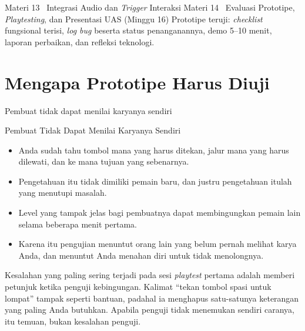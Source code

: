 \documentclass[aspectratio=169,10pt]{beamer}
\begin{document}
  {Materi 13 \textperiodcentered\ Integrasi Audio dan \emph{Trigger} Interaksi}
  {Materi 14 \textperiodcentered\ Evaluasi Prototipe, \emph{Playtesting}, dan
   Presentasi}
  {UAS (Minggu 16)}
  {Prototipe teruji: \emph{checklist} fungsional terisi, \emph{log bug} beserta
   status penanganannya, demo 5--10 menit, laporan perbaikan, dan refleksi
   teknologi.}

\section{Mengapa Prototipe Harus Diuji}
  {Pembuat tidak dapat menilai karyanya sendiri}

\begin{frame}{Pembuat Tidak Dapat Menilai Karyanya Sendiri}
\begin{itemize}
  \item Anda sudah tahu tombol mana yang harus ditekan, jalur mana yang harus
        dilewati, dan ke mana tujuan yang sebenarnya.
  \item Pengetahuan itu tidak dimiliki pemain baru, dan justru pengetahuan
        itulah yang menutupi masalah.
  \item Level yang tampak jelas bagi pembuatnya dapat membingungkan pemain
        lain selama beberapa menit pertama.
  \item Karena itu pengujian menuntut orang lain yang belum pernah melihat
        karya Anda, dan menuntut Anda menahan diri untuk tidak menolongnya.
\end{itemize}
\vspace{0.12cm}
\begin{peringatan}
Kesalahan yang paling sering terjadi pada sesi \emph{playtest} pertama adalah
memberi petunjuk ketika penguji kebingungan. Kalimat ``tekan tombol spasi untuk
lompat'' tampak seperti bantuan, padahal ia menghapus satu-satunya keterangan
yang paling Anda butuhkan. Apabila penguji tidak menemukan sendiri caranya, itu
temuan, bukan kesalahan penguji.
\end{peringatan}
\end{frame}
\end{document}
